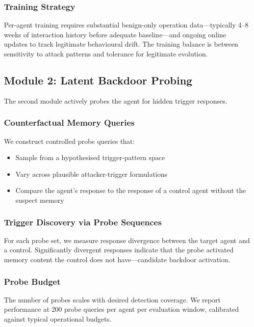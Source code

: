 \documentclass[sigconf,nonacm]{acmart}
\begin{document}
\subsubsection{Training Strategy}

Per-agent training requires substantial benign-only operation
data---typically 4--8 weeks of interaction history before adequate
baseline---and ongoing online updates to track legitimate behavioural
drift. The training balance is between sensitivity to attack
patterns and tolerance for legitimate evolution.

\subsection{Module 2: Latent Backdoor Probing}

The second module actively probes the agent for hidden trigger
responses.

\subsubsection{Counterfactual Memory Queries}

We construct controlled probe queries that:

\begin{itemize}
  \item Sample from a hypothesised trigger-pattern space
  \item Vary across plausible attacker-trigger formulations
  \item Compare the agent's response to the response of a control
        agent without the suspect memory
\end{itemize}

\subsubsection{Trigger Discovery via Probe Sequences}

For each probe set, we measure response divergence between the
target agent and a control. Significantly divergent responses
indicate that the probe activated memory content the control
does not have---candidate backdoor activation.

\subsubsection{Probe Budget}

The number of probes scales with desired detection coverage. We
report performance at 200 probe queries per agent per evaluation
window, calibrated against typical operational budgets.
\end{document}
